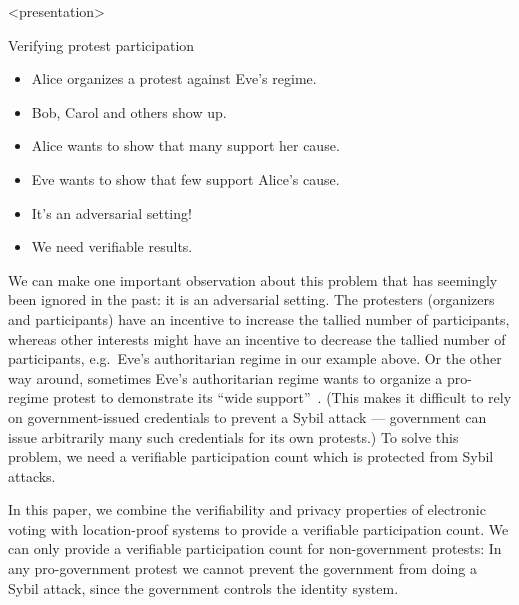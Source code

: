 \begin{frame}<presentation>
  \begin{block}{Verifying protest participation}
    \begin{itemize}
      \item Alice organizes a protest against Eve's regime.
      \item Bob, Carol and others show up.

        \pause{}

      \item {\color{green} Alice wants to show that many support her cause.}

        \pause{}

      \item {\color{red} Eve wants to show that few support Alice's cause.}
      \item It's an adversarial setting!
      \item We need verifiable results.
    \end{itemize}
  \end{block}
\end{frame}

We can make one important observation about this problem that has seemingly 
been ignored in the past: it is an adversarial setting.
The protesters (organizers and participants) have an incentive to increase the 
tallied number of participants, whereas other interests might have an incentive 
to decrease the tallied number of participants, e.g.\ Eve's authoritarian 
regime in our example above.
Or the other way around, sometimes Eve's authoritarian regime wants to organize 
a pro-regime protest to demonstrate its \enquote{wide 
  support}~\cite[e.g.][]{AlJazeeraOnVenezuela2017,VenezuelanStateWorkersCalledToParticipate}.
(This makes it difficult to rely on government-issued credentials to prevent a 
Sybil attack --- government can issue arbitrarily many such credentials for its 
own protests.)
To solve this problem, we need a verifiable participation count which is 
protected from Sybil attacks.


In this paper, we combine the verifiability and privacy properties of 
electronic voting with location-proof systems to provide a verifiable 
participation count.
We can only provide a verifiable participation count for non-government 
protests:
In any pro-government protest we cannot prevent the government from doing a 
Sybil attack, since the government controls the identity system.



